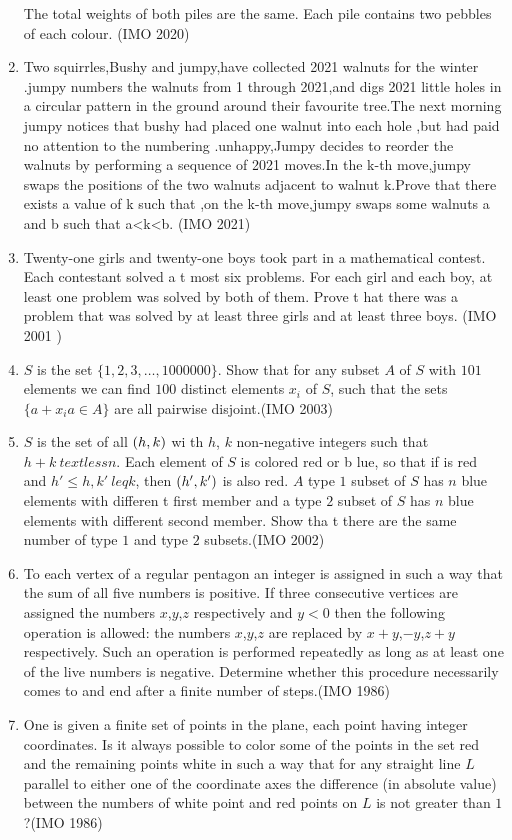 \begin{enumerate}
    The total weights of both piles are the same.
    Each pile contains two pebbles of each colour.
\hfill(IMO 2020)
\item Two squirrles,Bushy and jumpy,have collected 2021 walnuts for the winter .jumpy  numbers the walnuts from 1 through 2021,and digs 2021 little holes in a circular pattern in the ground around their favourite tree.The next morning jumpy notices that bushy had placed one walnut into each hole ,but had paid no attention to the numbering .unhappy,Jumpy decides to reorder the walnuts by performing a sequence of 2021 moves.In the k-th move,jumpy swaps the positions of the two walnuts adjacent to walnut k.Prove that there exists a value of k such that ,on the k-th move,jumpy swaps some walnuts a and b such that a\textless k\textless b.
\hfill(IMO 2021)
\item Twenty-one girls and twenty-one boys took part in a mathematical contest. Each contestant solved a t most six problems. For each girl and each boy, at least one problem was solved by both of them. Prove t hat there was a problem that was solved by at least three girls and at least three boys. \hfill(IMO 2001 )
\item $S$ is the set $\{1,2,3,\ldots, 1000000 \}$. Show that for any subset $A$ of $S$ with $101$ elements we can find $100$ distinct elements $x_{i}$ of $S$, such that the sets $\{a+x_{i} a\in A\}$ are all pairwise disjoint.\hfill(IMO 2003)
\item $S$ is the set of all $\left(h, k\right)$ wi th $h$, $k$ non-negative integers such that $h + k \ textless n$. Each element of $S$ is colored red or b lue, so that if  is red and $h'\leq h,k'\ leq k$, then $\left(h', k'\right)$ is also red. $A$ type $ 1$ subset of $S$ has $n$ blue elements with differen t first member and a type $2$ subset of $S$ has $n$ blue elements with different second member. Show tha t there are the same number of type $1$ and type $2$ subsets.\hfill (IMO 2002)
\item  To each vertex of a regular pentagon an integer is assigned in such a way that the sum of all five numbers is positive. If three consecutive vertices are assigned the numbers $x$,$y$,$z$ respectively and $y<0$ then the following operation is allowed: the numbers $x$,$y$,$z$ are replaced by $x+y$,$-y$,$z+y$ respectively. Such an operation is performed repeatedly as long as at least one of the live numbers is negative. Determine whether this procedure necessarily comes to and end after a finite number of steps.\hfill(IMO 1986)
\item One is given a finite set of points in the plane, each point having integer coordinates. Is it always possible to color some of the points in the set red and the remaining points white in such a way that for any straight line $L$ parallel to either one of the coordinate axes the difference (in absolute value) between the numbers of white point and red points on $L$ is not greater than $1$?\hfill(IMO 1986)

\end{enumerate}

